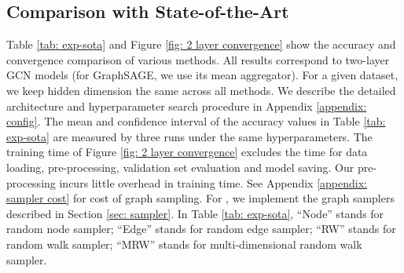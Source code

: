 \subsection{Comparison with State-of-the-Art}
\label{sec: sota}

Table \ref{tab: exp-sota} and Figure \ref{fig: 2 layer convergence} show the accuracy and convergence comparison of various methods. 
All results correspond to two-layer GCN models (for GraphSAGE, we use its mean aggregator). For a given dataset, we keep hidden dimension the same across all methods. We describe the detailed architecture and hyperparameter search procedure in Appendix \ref{appendix: config}. The mean and confidence interval of the accuracy values in Table \ref{tab: exp-sota} are measured by three runs under the same hyperparameters. 
The training time of Figure \ref{fig: 2 layer convergence} excludes the time for data loading, pre-processing, validation set evaluation and model saving. 
Our pre-processing incurs little overhead in training time. See Appendix \ref{appendix: sampler cost} for cost of graph sampling. 
For {\graphsaint}, we implement the graph samplers described in Section \ref{sec: sampler}. In Table \ref{tab: exp-sota}, ``Node'' stands for random node sampler; ``Edge'' stands for random edge sampler; ``RW'' stands for random walk sampler; ``MRW'' stands for multi-dimensional random walk sampler. %

